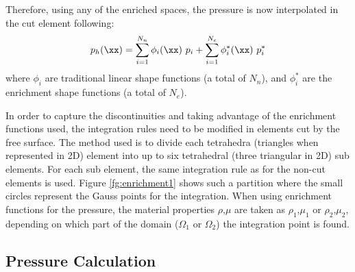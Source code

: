 
Therefore, using any of the enriched spaces, the pressure is now interpolated in the cut element following:
 \begin{equation}
      p_h(\xx) = \sum_{i=1}^{N_n} \phi_i(\xx) \ p_i + \sum_{i=1}^{N_e} \phi_i^*(\xx) \ p_i^*
   \end{equation}
where $\phi_i$ are traditional linear shape functions (a total of $N_n$), and $\phi_i^*$ are the enrichment shape functions (a total of $N_e$).

In order to capture the discontinuities and taking advantage of the enrichment functions used, the integration rules need to be modified in elements cut by the free surface. The method used is to divide each tetrahedra (triangles when represented in 2D) element into up to six tetrahedral
(three triangular in 2D) sub elements. For each sub element, the same integration rule as for the non-cut elements is used. Figure \ref{fg:enrichment1} shows such a partition where the small circles represent the Gauss points for the integration. When using enrichment functions for the pressure, the material properties $\rho$,$\mu$ are taken as $\rho_1$,$\mu_1$ or $\rho_2$,$\mu_2$, depending on which part of the domain ($\Omega_1$ or $\Omega_2$) the integration point is found.

   \subsection{Pressure Calculation}

